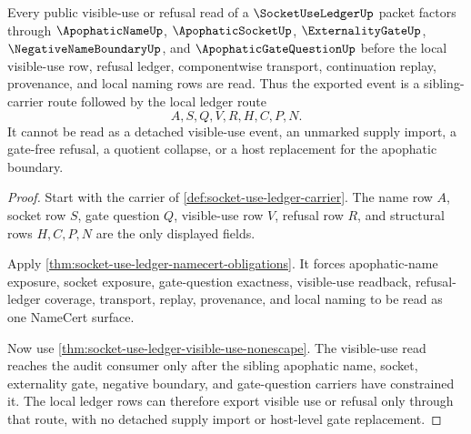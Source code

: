 \begin{theorem}
\label{thm:socket-use-ledger-public-visible-refusal}
Every public visible-use or refusal read of a $\SocketUseLedgerUp$ packet factors through $\ApophaticNameUp$, $\ApophaticSocketUp$, $\ExternalityGateUp$, $\NegativeNameBoundaryUp$, and $\ApophaticGateQuestionUp$ before the local visible-use row, refusal ledger, componentwise transport, continuation replay, provenance, and local naming rows are read. Thus the exported event is a sibling-carrier route followed by the local ledger route
$$
A,S,Q,V,R,H,C,P,N .
$$
It cannot be read as a detached visible-use event, an unmarked supply import, a gate-free refusal, a quotient collapse, or a host replacement for the apophatic boundary.
\end{theorem}
\begin{proof}
Start with the carrier of \autoref{def:socket-use-ledger-carrier}. The name row $A$, socket row $S$, gate question $Q$, visible-use row $V$, refusal row $R$, and structural rows $H,C,P,N$ are the only displayed fields.

Apply \autoref{thm:socket-use-ledger-namecert-obligations}. It forces apophatic-name exposure, socket exposure, gate-question exactness, visible-use readback, refusal-ledger coverage, transport, replay, provenance, and local naming to be read as one NameCert surface.

Now use \autoref{thm:socket-use-ledger-visible-use-nonescape}. The visible-use read reaches the audit consumer only after the sibling apophatic name, socket, externality gate, negative boundary, and gate-question carriers have constrained it. The local ledger rows can therefore export visible use or refusal only through that route, with no detached supply import or host-level gate replacement.
\end{proof}

